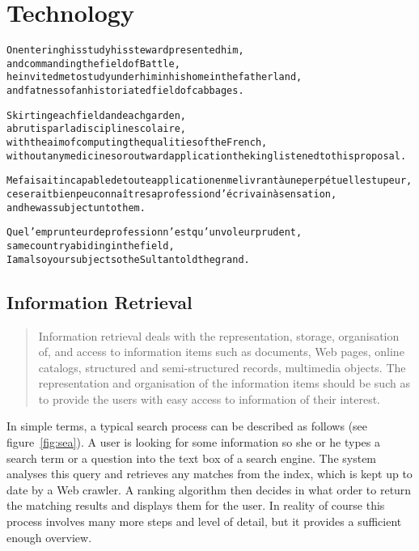 
\chapter{Technology}
\label{ch:technology}

\startcontents[chapters]

\vfill

\begin{alltt}\sffamily
On entering his study his steward presented him,
and commanding the field of Battle,
he invited me to study under him in his home in the fatherland,
and fatness of an historiated field of cabbages.

Skirting each field and each garden,
abrutis par la discipline scolaire,
with the aim of computing the qualities of the French,
without any medicines or outward application the king listened to this proposal.

Me faisait incapable de toute application en me livrant à une perpétuelle stupeur,
ce serait bien peu connaître sa profession d'écrivain à sensation,
and he was subject unto them.

Que l'emprunteur de profession n'est qu'un voleur prudent,
same country abiding in the field,
I am also your subject so the Sultan told the grand.
\end{alltt}

\newpage
\minicontents
\spirals



\section{Information Retrieval}

\begin{quotation}
  Information retrieval deals with the representation, storage, organisation of, and access to information items such as documents, Web pages, online catalogs, structured and semi-structured records, multimedia objects. The representation and organisation of the information items should be such as to provide the users with easy access to information of their interest. 
\end{quotation}

In simple terms, a typical search process can be described as follows (see figure~\ref{fig:sea}). A user is looking for some information so she or he types a search term or a question into the text box of a search engine. The system analyses this query and retrieves any matches from the index, which is kept up to date by a Web crawler. A ranking algorithm then decides in what order to return the matching results and displays them for the user. In reality of course this process involves many more steps and level of detail, but it provides a sufficient enough overview.

